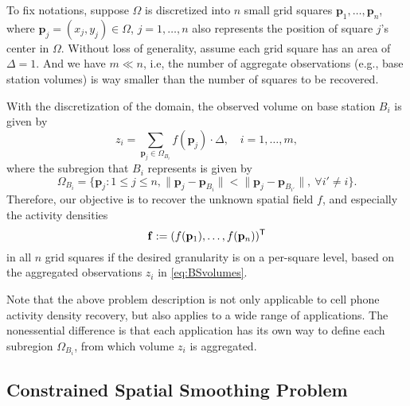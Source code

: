 To fix notations, suppose $\Omega$ is discretized into $n$ small grid squares $\mathbf p_1,\ldots, \mathbf p_n$, where $\mathbf p_j = (x_j,y_j)\in \Omega$, $j=1,\ldots,n$ also represents the position of square $j$'s center in $\Omega$. Without loss of generality, assume each grid square has an area of $\Delta=1$. And we have $m \ll n$, i.e, the number of aggregate observations (e.g., base station volumes) is way smaller than the number of squares to be recovered.

With the discretization of the domain, the observed volume on base station $B_i$ is given by
\begin{equation}\label{eq:BSvolumes}
	z_i = \sum_{\mathbf p_j \in \Omega_{B_i}}f(\mathbf p_j)\cdot \Delta,\quad i = 1,\ldots,m,
\end{equation}
where the subregion that $B_i$ represents is given by
\begin{equation}\label{eq:omegaBi}
	\Omega_{B_i} = \{\mathbf p_j: 1\le j\le n, \|\mathbf p_j-\mathbf p_{B_i}\|< \|\mathbf p_j-\mathbf p_{B_{i'}}\|, \ \forall i'\ne i\}.
\end{equation}
Therefore, our objective is to recover the unknown spatial field $f$, and especially the activity densities 
\[\mathbf f := (f(\mathbf p_1),\ldots, f(\mathbf p_n))^{\sf T}\] in all $n$ grid squares if the desired granularity is on a per-square level, based on the aggregated observations $z_i$ in \eqref{eq:BSvolumes}.

Note that the above problem description is not only applicable to cell phone activity density recovery, but also applies to a wide range of applications.
The nonessential difference is that each application has its own way to define each subregion $\Omega_{B_i}$, from which volume $z_i$ is aggregated.


\subsection{Constrained Spatial Smoothing Problem}

